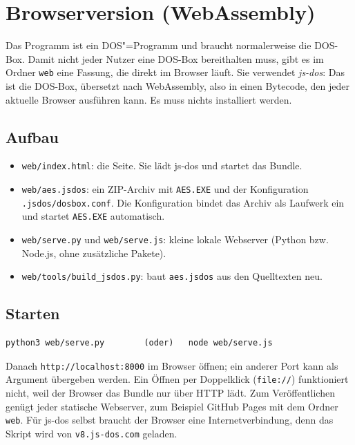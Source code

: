 \section{Browserversion (WebAssembly)}\label{sec:browser}

Das Programm ist ein DOS"=Programm und braucht normalerweise die DOS-Box. Damit nicht jeder Nutzer eine DOS-Box bereithalten muss, gibt es im Ordner \texttt{web} eine Fassung, die direkt im Browser läuft. Sie verwendet \emph{js-dos}: Das ist die DOS-Box, übersetzt nach WebAssembly, also in einen Bytecode, den jeder aktuelle Browser ausführen kann. Es muss nichts installiert werden.

\subsection{Aufbau}
\begin{itemize}
  \item \texttt{web/index.html}: die Seite. Sie lädt js-dos und startet das Bundle.
  \item \texttt{web/aes.jsdos}: ein ZIP-Archiv mit \texttt{AES.EXE} und der Konfiguration \texttt{.jsdos/dosbox.conf}. Die Konfiguration bindet das Archiv als Laufwerk  ein und startet \texttt{AES.EXE} automatisch.
  \item \texttt{web/serve.py} und \texttt{web/serve.js}: kleine lokale Webserver (Python bzw. Node.js, ohne zusätzliche Pakete).
  \item \texttt{web/tools/build\_jsdos.py}: baut \texttt{aes.jsdos} aus den Quelltexten neu.
\end{itemize}

\subsection{Starten}
\begin{lstlisting}[language={},caption={Lokalen Webserver starten},label={lst:webstart}]
python3 web/serve.py        (oder)   node web/serve.js
\end{lstlisting}
Danach \texttt{http://localhost:8000} im Browser öffnen; ein anderer Port kann als Argument übergeben werden. Ein Öffnen per Doppelklick (\texttt{file://}) funktioniert nicht, weil der Browser das Bundle nur über HTTP lädt. Zum Veröffentlichen genügt jeder statische Webserver, zum Beispiel GitHub Pages mit dem Ordner \texttt{web}. Für js-dos selbst braucht der Browser eine Internetverbindung, denn das Skript wird von \texttt{v8.js-dos.com} geladen.

